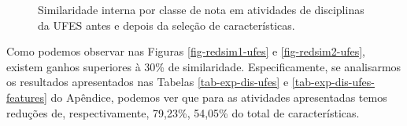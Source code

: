 \begin{figure}[!tbp]
  \hfill
  \caption{Similaridade interna por classe de nota em atividades de disciplinas da UFES antes e depois da seleção de características.}
\end{figure}

Como podemos observar nas Figuras \ref{fig-redsim1-ufes} e \ref{fig-redsim2-ufes}, existem ganhos superiores à 30\% de similaridade. Especificamente, se analisarmos os resultados apresentados nas Tabelas \ref{tab-exp-dis-ufes} e \ref{tab-exp-dis-ufes-features} do Apêndice, podemos ver que para as atividades apresentadas temos reduções de, respectivamente, 79,23\%, 54,05\% do total de características.

